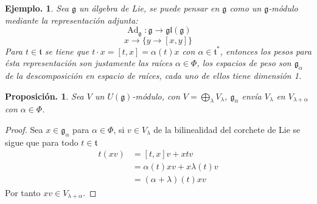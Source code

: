 \documentclass[11pt,a4paper]{article}
\newtheorem{proposition}{Proposici\'on.}
\newtheorem{example}{Ejemplo.}
\newcommand{\Ad}{\operatorname{Ad}}
\newcommand{\mfg}{\mathfrak{g}}
\begin{document}
\begin{example}
Sea $\mfg$ un álgebra de Lie,  se puede pensar en $\mfg$ como un $\mfg$-módulo  mediante la representación adjunta:
$$\Ad_{\mathfrak{g}}: \mathfrak{g} \longrightarrow \mathfrak{gl}(\mathfrak{g}) $$
$$x \longrightarrow \{ y \rightarrow [x,y] \} $$
Para $t\in \mathfrak{t}$ se tiene que $t\cdot x= [t,x]= \alpha(t)x$
 con $\alpha \in \mathfrak{t}^*$, entonces los pesos para ésta representación son justamente las raíces $\alpha \in \Phi$, los espacios de peso son $\mfg_{\alpha}$ de la descomposición en espacio de raíces, cada uno de ellos tiene dimensión 1.
\end{example}

\begin{proposition}
 Sea $V$ un  $U(\mfg)$-módulo,  con $V= \bigoplus_{\lambda }V_{\lambda}$,  $\mfg_{\alpha}$ envía $V_{\lambda}$ en $V_{\lambda + \alpha}$  con $\alpha \in \Phi$.
\end{proposition}
\begin{proof}
Sea $x \in \mfg_{\alpha}$ para $\alpha \in \Phi$, si $v \in V_{\lambda}$ de la bilinealidad del corchete de Lie se sigue que  para todo $t\in \mathfrak{t}$
\begin{align*}
    t(xv)&= [t,x]v + xtv \\
    &= \alpha(t)xv + x \lambda(t)v \\
    &=(\alpha + \lambda) (t) xv
\end{align*}
Por tanto $xv \in V_{\lambda+ \alpha}$.
\end{proof}
\end{document}
